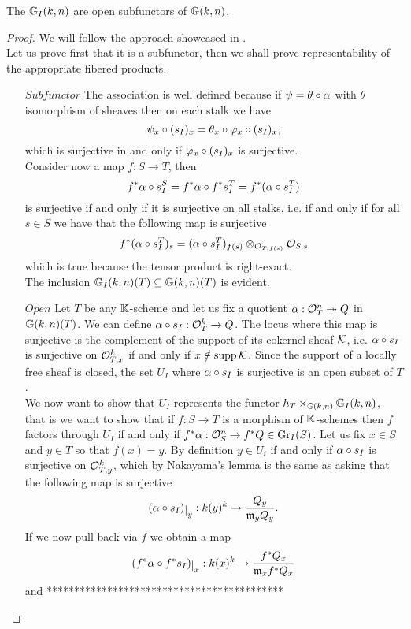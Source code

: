 \begin{proposition}\label{GrIAreOpenSubfunctors}
The $\mathbb{G}_I(k,n)$ are open subfunctors of $\mathbb{G}(k,n)$.
\end{proposition}
\begin{proof}
We will follow the approach showcased in \cite{Bejleri2}.\\
Let us prove first that it is a subfunctor, then we shall prove representability of the appropriate fibered products.
\setlength{\leftmargini}{0cm}
\begin{itemize}
\item[$\boxed{Subfunctor}$] The association is well defined because if $\psi=\theta\circ \alpha$ with $\theta$ isomorphism of sheaves then on each stalk we have
\[\psi_x\circ (s_I)_x=\theta_x\circ \varphi_x\circ (s_I)_x,\]
which is surjective in and only if $\varphi_x\circ (s_I)_x$ is surjective.\\
Consider now a map $f:S\to T$, then
\[f^\ast\alpha \circ s_I^S=f^\ast\alpha\circ f^\ast s_I^T=f^\ast(\alpha\circ s_I^T)\]
is surjective if and only if it is surjective on all stalks, i.e. if and only if for all $s\in S$ we have that the following map is surjective
\[f^\ast(\alpha\circ s_I^T)_s=(\alpha\circ s_I^T)_{f(s)}\otimes_{\mathcal{O}_{T,f(s)}}\mathcal{O}_{S,s}\]
which is true because the tensor product is right-exact.\\
The inclusion $\mathbb{G}_I(k,n)(T)\subseteq \mathbb{G}(k,n)(T)$ is evident.
\item[$\boxed{Open}$] Let $T$ be any $\mathbb{K}$-scheme and let us fix a quotient $\alpha:\mathcal{O}_T^n\twoheadrightarrow Q$ in $\mathbb{G}(k,n)(T)$. We can define $\alpha\circ s_I:\mathcal{O}_T^k\to Q$. The locus where this map is surjective is the complement of the support of its cokernel sheaf $\mathcal{K}$, i.e. $\alpha\circ s_I$ is surjective on $\mathcal{O}_{T,x}^k$ if and only if $x\notin \mathrm{supp}\,\mathcal{K}$. Since the support of a locally free sheaf is closed, the set $U_I$ where $\alpha\circ s_I$ is surjective is an open subset of $T$.\\
We now want to show that $U_I$ represents the functor $h_T\times_{\mathbb{G}(k,n)}\mathbb{G}_I(k,n)$, that is we want to show that if $f:S\to T$ is a morphism of $\mathbb{K}$-schemes then $f$ factors through $U_I$ if and only if $f^\ast\alpha:\mathcal{O}_S^n\to f^\ast Q \in \mathrm{Gr}_I(S)$. Let us fix $x\in S$ and $y\in T$ so that $f(x)=y$. By definition $y\in U_i$ if and only if $\alpha\circ s_I$ is surjective on $\mathcal{O}_{T,y}^k$, which by Nakayama's lemma is the same as asking that the following map is surjective
\[(\al\circ s_I)\res{y}:k(y)^k\to \frac{Q_y}{\mf_y Q_y}.\]
If we now pull back via $f$ we obtain a map
\[(f^\ast \al\circ f^\ast s_I)\res{x}:k(x)^k\to\frac{f^\ast Q_x}{\mf_x f^\ast Q_x} \]
and *******************************************
\end{itemize}
\setlength{\leftmargini}{0.5cm}

\end{proof}



